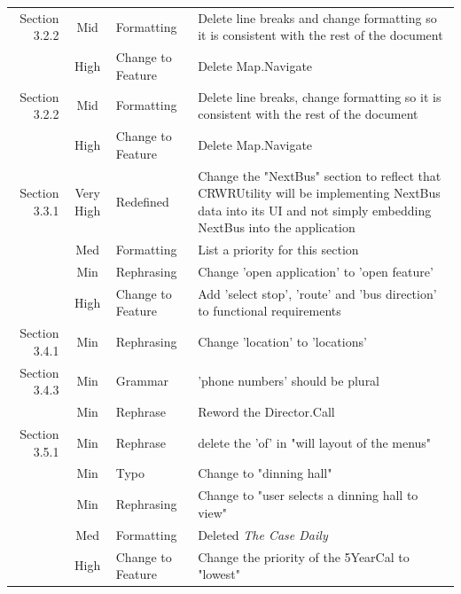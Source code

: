 \documentclass[pdftex,12pt,letter]{article}
\begin{document}
\begin{flushleft}
\begin{tabular}{|r|c|l|p{6cm}|}
\hline
Section 3.2.2 & Mid & Formatting & Delete line breaks and change formatting so it is consistent with the rest of the document\\
 & High & Change to Feature & Delete Map.Navigate\\
\hline
Section 3.2.2 & Mid & Formatting & Delete line breaks, change formatting so it is consistent with the rest of the document\\
 & High & Change to Feature & Delete Map.Navigate\\
\hline
Section 3.3.1 & Very High & Redefined & Change the "NextBus" section to reflect that CRWRUtility will be implementing NextBus data into its UI and not simply embedding NextBus into the application\\
& Med & Formatting & List a priority for this section\\
& Min & Rephrasing & Change 'open application' to 'open feature'\\
& High & Change to Feature & Add 'select stop', 'route' and 'bus direction'  to functional requirements\\
\hline
Section 3.4.1 & Min & Rephrasing & Change 'location' to 'locations'\\
\hline
Section 3.4.3 & Min & Grammar & 'phone numbers' should be plural\\
& Min & Rephrase & Reword the Director.Call \\
\hline
Section 3.5.1 & Min & Rephrase & delete the 'of' in "will layout of the menus"\\
& Min & Typo & Change to "dinning hall"\\
& Min & Rephrasing & Change to "user selects a dinning hall to view"\\
& Med & Formatting & Deleted \textit{The Case Daily}\\
& High & Change to Feature & Change the priority of the 5YearCal to "lowest"\\
\hline
\end{tabular}
\end{flushleft}
\end{document}
